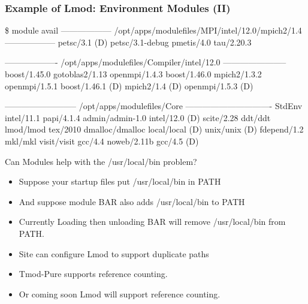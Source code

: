 \documentclass{beamer}
\begin{document}
\begin{frame}[fragile]
    \frametitle{Example of Lmod: Environment Modules (II)}
    {\tiny
\begin{semiverbatim}
\$ {\color{blue} module avail}
------------------ /opt/apps/modulefiles/MPI/intel/12.0/mpich2/1.4 ------------------
  petsc/3.1 (D)    petsc/3.1-debug    pmetis/4.0    tau/2.20.3

------------------- /opt/apps/modulefiles/Compiler/intel/12.0 -----------------------
  boost/1.45.0        gotoblas2/1.13      openmpi/1.4.3
  boost/1.46.0        mpich2/1.3.2        openmpi/1.5.1
  boost/1.46.1 (D)    mpich2/1.4    (D)   openmpi/1.5.3   (D)

-------------------------- /opt/apps/modulefiles/Core -------------------------------
  StdEnv               intel/11.1         papi/4.1.4
  admin/admin-1.0      intel/12.0  (D)    scite/2.28
  ddt/ddt              lmod/lmod          tex/2010
  dmalloc/dmalloc      local/local (D)    unix/unix    (D)
  fdepend/1.2          mkl/mkl            visit/visit
  gcc/4.4              noweb/2.11b
  gcc/4.5        (D)
\end{semiverbatim}
    }
\end{frame}


\begin{frame}{Can Modules help with the /usr/local/bin problem?}
  \begin{itemize}
    \item Suppose your startup files put /usr/local/bin in PATH
    \item And suppose module BAR also adds /usr/local/bin to PATH
    \item Currently Loading then unloading BAR will remove
      /usr/local/bin from PATH. 
    \item Site can configure Lmod to support duplicate paths
    \item Tmod-Pure supports reference counting.
    \item Or coming soon Lmod will support reference counting.
  \end{itemize}
\end{frame}
\end{document}
